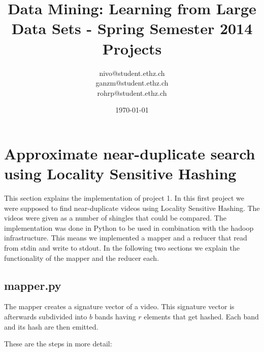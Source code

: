\documentclass[a4paper, 11pt]{article}
\title{Data Mining: Learning from Large Data Sets - Spring Semester 2014 Projects}
\author{nivo@student.ethz.ch\\ ganzm@student.ethz.ch\\ rohrp@student.ethz.ch\\}
\date{\today}
\begin{document}
\maketitle

\section{Approximate near-duplicate search using Locality Sensitive Hashing} 

This section explains the implementation of project 1. In this first project we
were supposed to find near-duplicate videos using Locality Sensitive Hashing.
The videos were given as a number of shingles that could be compared. The
implementation was done in Python to be used in combination with the hadoop
infrastructure. This means we implemented a mapper and a reducer that read from
stdin and write to stdout. In the following two sections we explain the
functionality of the mapper and the reducer each.

\subsection*{mapper.py}

The mapper creates a signature vector of a video. This signature
vector is afterwards subdivided into $b$ bands having $r$ elements that get
hashed. Each band and its hash are then emitted.

These are the steps in more detail:
\end{document}

